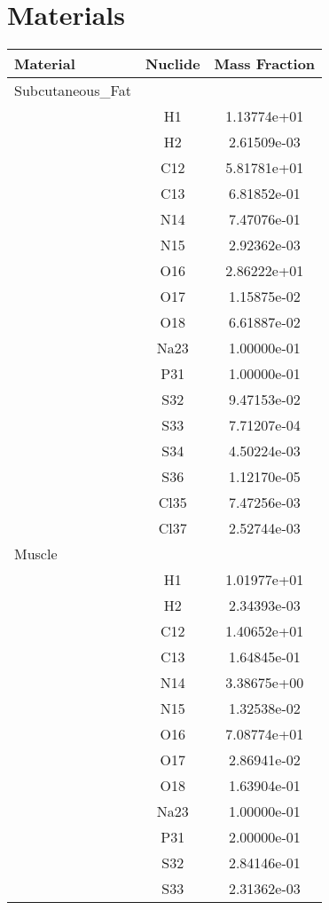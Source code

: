 \section{Materials} \label{App:A1}

\begin{centering}
\begin{longtable}{l c c}%
\toprule
\textbf{Material} & \textbf{Nuclide} & \textbf{Mass Fraction} \\ 
\hline
Subcutaneous\_Fat & & \\
\hline
& H1 & 1.13774e+01 \\ 
& H2 & 2.61509e-03 \\ 
& C12 & 5.81781e+01 \\ 
& C13 & 6.81852e-01 \\ 
& N14 & 7.47076e-01 \\ 
& N15 & 2.92362e-03 \\ 
& O16 & 2.86222e+01 \\ 
& O17 & 1.15875e-02 \\ 
& O18 & 6.61887e-02 \\ 
& Na23 & 1.00000e-01 \\ 
& P31 & 1.00000e-01 \\ 
& S32 & 9.47153e-02 \\ 
& S33 & 7.71207e-04 \\ 
& S34 & 4.50224e-03 \\ 
& S36 & 1.12170e-05 \\ 
& Cl35 & 7.47256e-03 \\ 
& Cl37 & 2.52744e-03 \\ 
\hline
Muscle & & \\
\hline
& H1 & 1.01977e+01 \\ 
& H2 & 2.34393e-03 \\ 
& C12 & 1.40652e+01 \\ 
& C13 & 1.64845e-01 \\ 
& N14 & 3.38675e+00 \\ 
& N15 & 1.32538e-02 \\ 
& O16 & 7.08774e+01 \\ 
& O17 & 2.86941e-02 \\ 
& O18 & 1.63904e-01 \\ 
& Na23 & 1.00000e-01 \\ 
& P31 & 2.00000e-01 \\ 
& S32 & 2.84146e-01 \\ 
& S33 & 2.31362e-03 \\ 

\end{longtable}
\end{centering}
